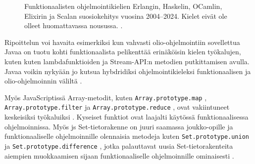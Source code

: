\begin{figure}[htbp]
    \datatable
    \pgfplotstablegetrowsof{\datatable}
    \centering
    \caption{Funktionaalisten ohjelmointikielien Erlangin, Haskelin, OCamlin, Elixirin ja Scalan suosiokehitys vuosina 2004–2024. Kielet eivät ole olleet huomattavassa nousussa. \cite{fplanggoogletrend}.}
    \label{fig:fplangpopularity}
\end{figure}

Ripoittelun voi havaita esimerkiksi kun vahvasti olio-ohjelmointiin sovellettua Javaa on tuotu kohti funktionaalista pelikenttää erinäköisin kielen työkalujen, kuten kuten lambdafunktioiden \cite{oracle_function_package} ja Stream-API:n metodien putkittamisen \cite{oracle_stream_api} avulla.
Javaa voikin nykyään jo kutsua hybdridiksi ohjelmointikieleksi funktionaalisen ja olio-ohjelmoinnin väliltä \cite[50]{sundstrom_java_fp}.

Myös JavaScriptissä Array-metodit, kuten \texttt{Array.prototype.map} \cite{mdn_array_map}, \texttt{Array.prototype.filter} \cite{mdn_array_filter} ja \texttt{Array.prototype.reduce} \cite{mdn_array_reduce}, ovat vakiintuneet keskeisiksi työkaluiksi \cite{vakil2016,8_must_know_array_methods}. Kyseiset funktiot ovat laajalti käytössä funktionaalisessa ohjelmoinnissa. Myös \gls{js} Set-tietorakenne on juuri saamassa joukko-opille ja funktionaaliselle ohjelmoinnille olennaisia metodeja kuten \texttt{Set.prototype.union} \cite{mdn_set_union} ja \texttt{Set.prototype.difference} \cite{mdn_set_intersection}, jotka palauttavat uusia Set-tietorakenteita aiempien muokkaamisen sijaan funktionaaliselle ohjelmoinnille ominaisesti \cite{mdn_set_methods}.

